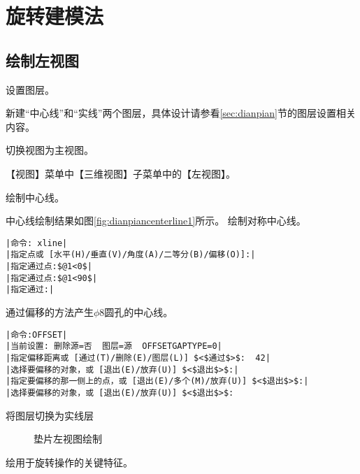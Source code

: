 \section{旋转建模法}
\subsection{绘制左视图}
\begin{procedure}
\item 设置图层。

新建“中心线”和“实线”两个图层，具体设计请参看\ref{sec:dianpian}节的图层设置相关内容。
\item  切换视图为主视图。

【视图】菜单中【三维视图】子菜单中的【左视图】。
\item 绘制中心线。

中心线绘制结果如图\ref{fig:dianpiancenterline1}所示。
绘制对称中心线。
\begin{lstlisting}
|命令: xline|
|指定点或 [水平(H)/垂直(V)/角度(A)/二等分(B)/偏移(O)]:|
|指定通过点:$@1<0$|
|指定通过点:$@1<90$|
|指定通过:|
\end{lstlisting}
通过偏移的方法产生$\phi 8$圆孔的中心线。
\begin{lstlisting}
|命令:OFFSET|
|当前设置: 删除源=否  图层=源  OFFSETGAPTYPE=0|
|指定偏移距离或 [通过(T)/删除(E)/图层(L)] $<$通过$>$:  42|
|选择要偏移的对象，或 [退出(E)/放弃(U)] $<$退出$>$:|
|指定要偏移的那一侧上的点，或 [退出(E)/多个(M)/放弃(U)] $<$退出$>$:|
|选择要偏移的对象，或 [退出(E)/放弃(U)] $<$退出$>$:
\end{lstlisting}
\item 将图层切换为实线层
\begin{figure}[htbp]
\centering
{}\hspace{40pt}
\caption{垫片左视图绘制}
\end{figure}
\item 绘用于旋转操作的关键特征。


\end{procedure}
